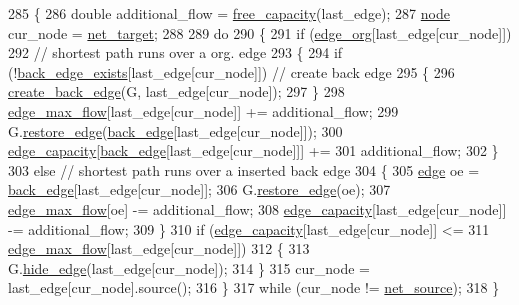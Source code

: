 \begin{DoxyCode}
285 \{
286     \textcolor{keywordtype}{double} additional\_flow = \mbox{\hyperlink{classmaxflow__sap_abd2935db387f32891228291a52d6ad45}{free\_capacity}}(last\_edge);
287     \mbox{\hyperlink{classnode}{node}} cur\_node = \mbox{\hyperlink{classmaxflow__sap_a8d0e8f448ed29a1329a70c8f4f496c2c}{net\_target}};
288 
289     \textcolor{keywordflow}{do}
290     \{
291         \textcolor{keywordflow}{if} (\mbox{\hyperlink{classmaxflow__sap_ac445d8c2f7e2080e890a9cdf7413c372}{edge\_org}}[last\_edge[cur\_node]])
292             \textcolor{comment}{// shortest path runs over a org. edge}
293         \{
294             \textcolor{keywordflow}{if} (!\mbox{\hyperlink{classmaxflow__sap_a13f2b98efc2a4f62fab4ac391ca83a51}{back\_edge\_exists}}[last\_edge[cur\_node]]) \textcolor{comment}{// create back edge}
295             \{
296                 \mbox{\hyperlink{classmaxflow__sap_a4278d120bdbc505abb176f5ca6ba02b3}{create\_back\_edge}}(G, last\_edge[cur\_node]);
297             \}
298             \mbox{\hyperlink{classmaxflow__sap_a25820db833a98efc69fc3edb79fc49d3}{edge\_max\_flow}}[last\_edge[cur\_node]] += additional\_flow;
299             G.\mbox{\hyperlink{classgraph_a2e5426682a0897b9f9104b019970bedc}{restore\_edge}}(\mbox{\hyperlink{classmaxflow__sap_a34793d0909089155a9957deed7c0e1b7}{back\_edge}}[last\_edge[cur\_node]]);
300             \mbox{\hyperlink{classmaxflow__sap_acfa95eef5ea5bf7814c4dabd3994bc63}{edge\_capacity}}[\mbox{\hyperlink{classmaxflow__sap_a34793d0909089155a9957deed7c0e1b7}{back\_edge}}[last\_edge[cur\_node]]] +=
301                 additional\_flow;
302         \}
303         \textcolor{keywordflow}{else}    \textcolor{comment}{// shortest path runs over a inserted back edge}
304         \{
305             \mbox{\hyperlink{classedge}{edge}} oe = \mbox{\hyperlink{classmaxflow__sap_a34793d0909089155a9957deed7c0e1b7}{back\_edge}}[last\_edge[cur\_node]];
306             G.\mbox{\hyperlink{classgraph_a2e5426682a0897b9f9104b019970bedc}{restore\_edge}}(oe);
307             \mbox{\hyperlink{classmaxflow__sap_a25820db833a98efc69fc3edb79fc49d3}{edge\_max\_flow}}[oe] -= additional\_flow;
308             \mbox{\hyperlink{classmaxflow__sap_acfa95eef5ea5bf7814c4dabd3994bc63}{edge\_capacity}}[last\_edge[cur\_node]] -= additional\_flow;
309         \}
310         \textcolor{keywordflow}{if} (\mbox{\hyperlink{classmaxflow__sap_acfa95eef5ea5bf7814c4dabd3994bc63}{edge\_capacity}}[last\_edge[cur\_node]] <=
311             \mbox{\hyperlink{classmaxflow__sap_a25820db833a98efc69fc3edb79fc49d3}{edge\_max\_flow}}[last\_edge[cur\_node]])
312         \{
313             G.\mbox{\hyperlink{classgraph_ab2f8520bcac080d73c55228fecc61825}{hide\_edge}}(last\_edge[cur\_node]);
314         \}
315         cur\_node = last\_edge[cur\_node].source();
316     \}
317     \textcolor{keywordflow}{while} (cur\_node != \mbox{\hyperlink{classmaxflow__sap_abd4266c76dbd73f7f719d3a4fba2655d}{net\_source}});
318 \}
\end{DoxyCode}
